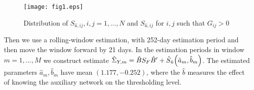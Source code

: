 \begin{figure}[htbp]
    \centering
    \texttt{[image: fig1.eps]}
    \caption{Distribution of \(S_{\hat{u},ij}, i,j = 1,\dots,N\) and \(S_{\hat{u},ij}\) for \(i,j\) such that \(G_{ij} >0\) }
    \label{<label>}
\end{figure}

Then we use a rolling-window estimation, with 252-day estimation period and then move the window forward by 21 days. In the estimation periods in window  \(m= 1, \dots,M\) we construct estimate \(\hat{\Sigma}_{Y,m} = \hat{B}S_{F}\hat{B}' + \hat{S}_{\hat{u}}\pqty{\hat{a}_{m}, \hat{b}_{m}}\). The estimated parameters \(\hat{a}_{m},\hat{b}_{m} \)  have mean \((1.177, -0.252)\), where the \(\hat{b}\) measures the effect of knowing the auxiliary network on the thresholding level. 
